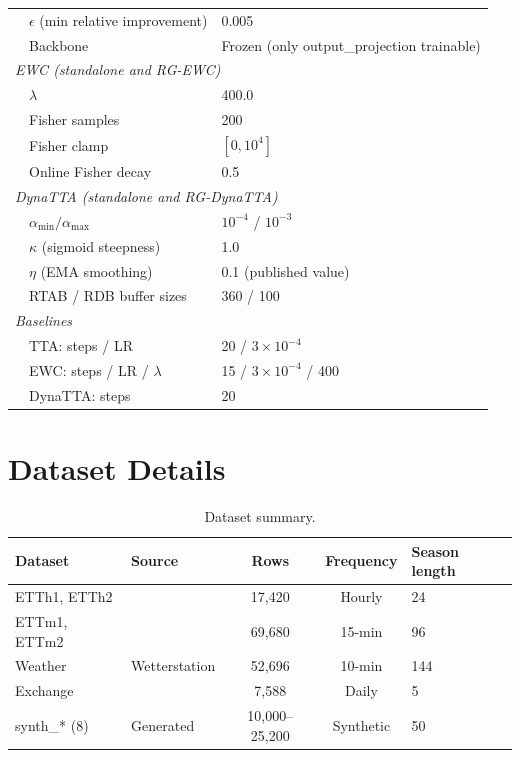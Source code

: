 \documentclass[11pt,a4paper]{article}
\begin{document}
\begin{table}[t]
\begin{tabular}{lll}
& $\epsilon$ (min relative improvement) & 0.005 \\
& Backbone & Frozen (only output\_projection trainable) \\
\midrule
\multicolumn{3}{l}{\emph{EWC (standalone and RG-EWC)}} \\
& $\lambda$ & 400.0 \\
& Fisher samples & 200 \\
& Fisher clamp & $[0, 10^4]$ \\
& Online Fisher decay & 0.5 \\
\midrule
\multicolumn{3}{l}{\emph{DynaTTA (standalone and RG-DynaTTA)}} \\
& $\alpha_{\min} / \alpha_{\max}$ & $10^{-4}$ / $10^{-3}$ \\
& $\kappa$ (sigmoid steepness) & 1.0 \\
& $\eta$ (EMA smoothing) & 0.1 (published value) \\
& RTAB / RDB buffer sizes & 360 / 100 \\
\midrule
\multicolumn{3}{l}{\emph{Baselines}} \\
& TTA: steps / LR & 20 / $3 \times 10^{-4}$ \\
& EWC: steps / LR / $\lambda$ & 15 / $3 \times 10^{-4}$ / 400 \\
& DynaTTA: steps & 20 \\
\bottomrule
\end{tabular}
\end{table}

\section{Dataset Details}
\label{app:datasets}

\begin{table}[t]
\centering
\caption{Dataset summary.}
\label{tab:datasetdesc}
\small
\begin{tabular}{llccl}
\toprule
Dataset & Source & Rows & Frequency & Season length \\
\midrule
ETTh1, ETTh2 & \citet{zhou2021informer} & 17,420 & Hourly & 24 \\
ETTm1, ETTm2 & \citet{zhou2021informer} & 69,680 & 15-min & 96 \\
Weather & Wetterstation & 52,696 & 10-min & 144 \\
Exchange & \citet{lai2018modeling} & 7,588 & Daily & 5 \\
\midrule
synth\_* (8) & Generated & 10,000--25,200 & Synthetic & 50 \\
\bottomrule
\end{tabular}
\end{table}
\end{document}
